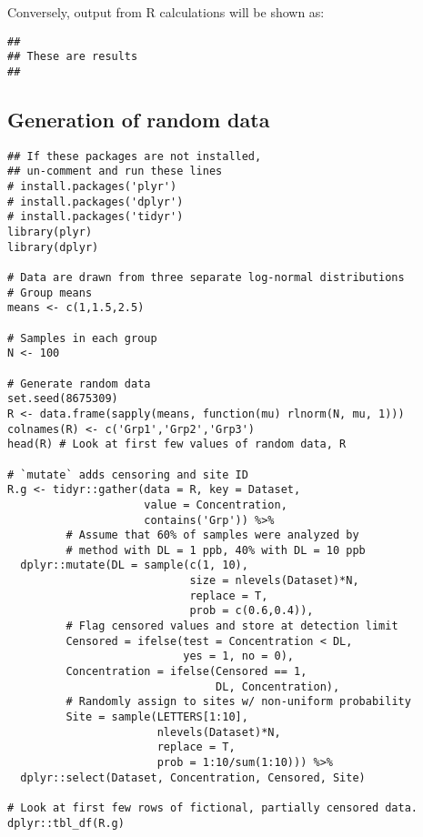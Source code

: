 Conversely, output from R calculations will be shown as:

\begin{verbatim}
##
## These are results
##
\end{verbatim}

\subsection{Generation of random data}
\begin{snugshade}
\begin{verbatim}
## If these packages are not installed,
## un-comment and run these lines
# install.packages('plyr')
# install.packages('dplyr')
# install.packages('tidyr')
library(plyr)
library(dplyr)

# Data are drawn from three separate log-normal distributions
# Group means
means <- c(1,1.5,2.5)

# Samples in each group
N <- 100

# Generate random data
set.seed(8675309)
R <- data.frame(sapply(means, function(mu) rlnorm(N, mu, 1)))
colnames(R) <- c('Grp1','Grp2','Grp3')
head(R) # Look at first few values of random data, R

# `mutate` adds censoring and site ID
R.g <- tidyr::gather(data = R, key = Dataset,
                     value = Concentration,
                     contains('Grp')) %>%
         # Assume that 60% of samples were analyzed by
         # method with DL = 1 ppb, 40% with DL = 10 ppb
  dplyr::mutate(DL = sample(c(1, 10),
                            size = nlevels(Dataset)*N,
                            replace = T,
                            prob = c(0.6,0.4)),
         # Flag censored values and store at detection limit
         Censored = ifelse(test = Concentration < DL,
                           yes = 1, no = 0),
         Concentration = ifelse(Censored == 1,
                                DL, Concentration),
         # Randomly assign to sites w/ non-uniform probability
         Site = sample(LETTERS[1:10],
                       nlevels(Dataset)*N,
                       replace = T,
                       prob = 1:10/sum(1:10))) %>%
  dplyr::select(Dataset, Concentration, Censored, Site)

# Look at first few rows of fictional, partially censored data.
dplyr::tbl_df(R.g)
\end{verbatim}
\end{snugshade}

